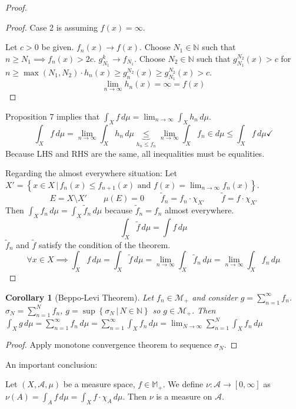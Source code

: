 \documentclass{article}
\newtheorem*{corollary}{Corollary}%
\newcommand{\setdef}[2]{\left\{\left.#1\,\right|\,#2\right\}}
\begin{document}
\begin{proof}
\begin{proof}
    Case 2 is assuming $f(x) = \infty$.

    Let $c > 0$ be given. $f_n(x) \to f(x)$. Choose $N_1 \in \mathbb N$ such that $n \geq N_1 \implies f_n(x) > 2c$. $g_{N_1}^k \to f_{N_1}$.
    Choose $N_2 \in \mathbb N$ such that $g_{N_1}^{N_2}(x) > c$ for $n \geq \max(N_1, N_2) \cdot h_n(x) \geq g_n^{N_2}(x) \geq g_{N_1}^{N_2}(x) > c$.
    \[ \lim_{n\to\infty} h_n(x) = \infty = f(x) \]
  \end{proof}

  Proposition 7 implies that $\int_X f \, d\mu = \lim_{n\to\infty} \int_X h_n \, d\mu$.
  \[ \int_X f \, d\mu = \lim_{n\to\infty} \int_X h_n \, d\mu \underbrace{\leq}_{h_n \leq f_n} \lim_{n\to\infty} \int_X f_n \in d\mu \leq \int_X f \, d\mu \checkmark \]
  Because LHS and RHS are the same, all inequalities must be equalities.

  Regarding the almost everywhere situation:
  Let $X' = \setdef{x \in X}{f_n(x) \leq f_{n+1}(x) \text{ and } f(x) = \lim_{n\to\infty} f_n(x)}$.
  \[ E = X \setminus X' \qquad \mu(E) = 0 \qquad \tilde f_n = f_n \cdot \chi_{X'} \qquad \tilde f = f \cdot \chi_{X'} \]
  Then $\int_X f_n \, d\mu = \int_X \tilde f_n \, d\mu$ because $\tilde f_n = f_n$ almost everywhere.
  \[ \int_X \tilde f \, d\mu = \int f \, d\mu \]
  $\tilde f_n$ and $\tilde f$ satisfy the condition of the theorem.
  \[ \forall x \in X \implies \int_X f \, d\mu = \int_X \tilde f \, d\mu = \lim_{n\to\infty} \int_X \tilde f_n \, d\mu = \lim_{n\to\infty} \int_X f_n \, d\mu \]
\end{proof}

\begin{corollary}[Beppo-Levi Theorem] %
  Let $f_n \in \mathcal M_+$ and consider $g = \sum_{n=1}^\infty f_n$. $\sigma_N = \sum_{n=1}^N f_n$, $g = \sup\setdef{\sigma_N}{N \in \mathbb N}$ so $g \in \mathcal M_+$.
  Then $\int_X g \, d\mu = \sum_{n=1}^\infty f_n \, d\mu = \sum_{n=1}^\infty \int_X f_n \, d\mu = \lim_{N\to\infty} \sum_{n=1}^N \int_X f_n \, d\mu$
\end{corollary}
\begin{proof}
  Apply monotone convergence theorem to sequence $\sigma_N$.
\end{proof}

An important conclusion:

Let $(X, \mathcal A, \mu)$ be a measure space, $f \in \mathbb M_+$.
We define $\nu: \mathcal A \to [0, \infty]$ as $\nu(A) = \int_A f \, d\mu = \int_X f \cdot \chi_A \, d\mu$.
Then $\nu$ is a measure on $\mathcal A$.
\end{document}
